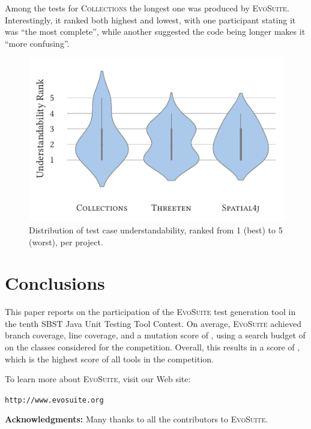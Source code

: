 \documentclass[10pt,conference]{IEEEtran}
\newcommand{\project}[1]{\textsc{#1}\xspace}
\newcommand{\Collections}{\project{Collections}}
\newcommand{\EVOSUITE}{\textsc{EvoSuite}\xspace}
\begin{document}
Among the tests for \Collections the longest one was produced by \EVOSUITE.
Interestingly, it ranked both highest and lowest, with one participant
stating it was ``the most complete'', while another suggested the code
being longer makes it ``more confusing''.


\begin{figure}
  \includegraphics[width=0.9\columnwidth]{./data/understandability}
  \caption{Distribution of test case understandability, ranked from 1 (best) to 5 (worst), per project.}
  \label{fig:readability}
\end{figure}


\section{Conclusions}

This paper reports on the participation of the \EVOSUITE test generation tool
in the tenth SBST Java Unit Testing Tool Contest. On average, \EVOSUITE
achieved \avgConditionsCoverageRatioLong branch coverage,
\avgLinesCoverageRatioLong line coverage, and a mutation score of
\avgMutantsCoverageRatioLong, using a search budget of \budgetLong on the \cuts
classes considered for the competition. Overall, this results in a score of
\score, which is the highest score of all tools in the competition.


To learn more about \EVOSUITE, visit our Web site:
\begin{center}
\texttt{http://www.evosuite.org}
\end{center}



\textbf{Acknowledgments:} Many thanks to all the contributors to
\EVOSUITE.




\balance
\end{document}
